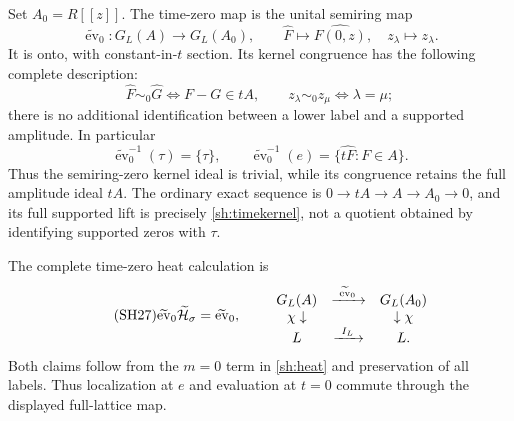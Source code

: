 Set $A_0=R[[z]]$. The time-zero map is the unital semiring map
\begin{equation}\tag{SH24}\label{sh:evzero}
 \widetilde{\operatorname{ev}}_0:G_L(A)\to G_L(A_0),\qquad
 \widehat F\mapsto\widehat{F(0,z)},\quad
 z_\lambda\mapsto z_\lambda .
\end{equation}
It is onto, with constant-in-$t$ section. Its kernel congruence
has the following complete description:
\begin{equation}\tag{SH25}\label{sh:timekernel}
 \widehat F\sim_0\widehat G
 \iff F-G\in tA,\qquad
 z_\lambda\sim_0z_\mu\iff\lambda=\mu;
\end{equation}
there is no additional identification between a lower label and
a supported amplitude. In particular
\begin{equation}\tag{SH26}\label{sh:timefibres}
 \widetilde{\operatorname{ev}}_0^{-1}(\tau)=\{\tau\},\qquad
 \widetilde{\operatorname{ev}}_0^{-1}(e)
       =\{\widehat{tF}:F\in A\}.
\end{equation}
Thus the semiring-zero kernel ideal is trivial, while its
congruence retains the full amplitude ideal $tA$.
The ordinary exact sequence is
$0\to tA\to A\to A_0\to0$, and its full supported lift is
precisely \eqref{sh:timekernel}, not a quotient obtained by
identifying supported zeros with $\tau$.

The complete time-zero heat calculation is
\begin{equation}\tag{SH27}\label{sh:timeheat}
 \widetilde{\operatorname{ev}}_0\widetilde\Ht_\sigma
     =\widetilde{\operatorname{ev}}_0,\qquad
 \begin{array}{ccc}
 G_L(A)&\xrightarrow{\ \widetilde{\operatorname{ev}}_0\ }&G_L(A_0)\\
 \chi\downarrow&&\downarrow\chi\\
 L&\xrightarrow{\ I_L\ }&L .
 \end{array}
\end{equation}
Both claims follow from the $m=0$ term in
\eqref{sh:heat} and preservation of all labels.
Thus localization at $e$ and evaluation at $t=0$ commute
through the displayed full-lattice map.

